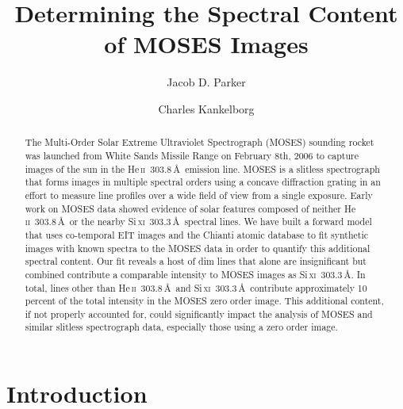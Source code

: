 

\newcommand{\cck}[1]{{\color{red} CCK: #1}} %
\newcommand{\jdp}[1]{{\color{blue} JDP: #1}} %

\newcommand{\spectralline}[3]{#1\,{\textsc{#2}}\ #3\,\AA } 
\newcommand{\heii}{\spectralline{He}{ii}{303.8}}
\newcommand{\sixi}{\spectralline{Si}{xi}{303.3}}
\newcommand{\fexv}{\spectralline{Fe}{xv}{284}}
\newcommand{\fexvi}{\spectralline{Fe}{xvi}{335}}

\newcommand{\sixipix}{15.7}
\newcommand{\spectdispersvel}{$\approx30$\,km\,s$^{-1}$ per pixel}
\newcommand{\spectdisperspix}{$\approx29$\,m\AA\ per pixel}



\title{Determining the Spectral Content of MOSES Images}

\author[0000-0001-8732-8284]{Jacob D. Parker}
\author[0000-0002-1992-7469]{Charles Kankelborg}


\begin{abstract}
	The Multi-Order Solar Extreme Ultraviolet Spectrograph (MOSES) sounding rocket was launched from White Sands Missile Range on February 8th, 2006 to capture images of the sun in the \heii \ emission line.
	MOSES is a slitless spectrograph that forms images in multiple spectral orders using a concave diffraction grating in an effort to measure line profiles over a wide field of view from a single exposure.
	Early work on MOSES data showed evidence of solar features composed of neither \heii \ or the nearby \sixi \ spectral lines.
	We have built a forward model that uses co-temporal EIT images and the Chianti atomic database to fit synthetic images with known spectra to the MOSES data in order to quantify this additional spectral content.
	Our fit reveals a host of dim lines that alone are insignificant but combined contribute a comparable intensity to MOSES images as \sixi.
	In total, lines other than \heii\ and \sixi\ contribute approximately 10 percent of the total intensity in the MOSES zero order image.
	This additional content, if not properly accounted for, could significantly impact the analysis of MOSES and similar slitless spectrograph data, especially those using a zero order image. 
\end{abstract}


\section{Introduction}\label{sec:intro}
	
